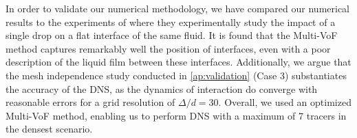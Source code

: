 In order to validate our numerical methodology, we have compared our numerical results to the experiments of \citet{mohamed2003drop} where they experimentally study the impact of a single drop on a flat interface of the same fluid.%
It is found that the Multi-VoF method captures remarkably well the position of interfaces, even with a poor description of the liquid film between these interfaces.
Additionally, we argue that the mesh independence study conducted in \ref{ap:validation} (Case 3) substantiates the accuracy of the DNS, as the dynamics of interaction do converge with  reasonable errors for a grid resolution of $\Delta/d = 30$. 
Overall, we used an optimized Multi-VoF method, enabling us to perform DNS with a maximum of 7 tracers in the densest scenario.
 





